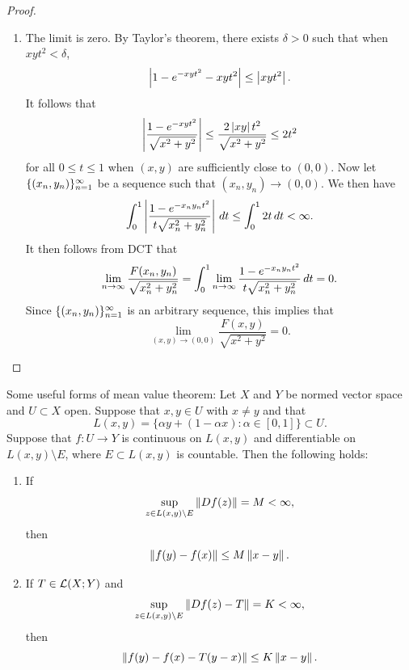 \documentclass[a4paper]{article}
\begin{document}
\begin{proof}
\begin{enumerate}
    \item The limit is zero. By Taylor's theorem, there exists $\delta >
          0$ such that when $x y t^2 < \delta$,
          \[
            \left\lvert 1 - e^{- x y t^2} - x y t^2\right\rvert \leq \left\lvert x y t^2\right\rvert.
          \]
          It follows that
          \[
            \left\lvert \frac{1 - e^{- x y t^2}}{\sqrt{x^2 + y^2}}\right\rvert
            \leq \frac{2 \left\lvert x y\right\rvert t^2}{\sqrt{x^2 + y^2}}
            \leq 2 t^2
          \]
          for all $0 \leq t \leq 1$ when $(x, y)$ are sufficiently close
          to $(0, 0)$. Now let $\{ (x_n, y_n) \}_{n=1}^\infty$ be a sequence such
          that $(x_n, y_n) \to (0, 0)$. We then have
          \[
            \int_0^1 \left\lvert \frac{1 - e^{- x_n y_n t^2}}{t \sqrt{x_n^2 + y_n^2}}\right\rvert \, d t
            \leq \int_0^1 2 t \, d t < \infty.
          \]
          It then follows from DCT that
          \[
            \lim_{n \to \infty} \frac{F(x_n, y_n)}{\sqrt{x_n^2 + y_n^2}}
            = \int_0^1 \lim_{n \to \infty} \frac{1 - e^{- x_n y_n t^2}}{t \sqrt{x_n^2 + y_n^2}} \, d t
            = 0.
          \]
          Since $\{ (x_n, y_n) \}_{n=1}^\infty$ is an arbitrary sequence, this
          implies that
          \[
            \lim_{(x, y) \to (0, 0)}  \frac{F(x, y)}{\sqrt{x^2 + y^2}} = 0.
          \]

  \end{enumerate}
\end{proof}

\begin{remark}

  Some useful forms of mean value theorem: Let $X$ and $Y$ be normed
  vector space and $U \subset X$ open. Suppose that $x, y \in U$ with $x
  \neq y$ and that
  \[
    L(x, y) = \{\alpha y + (1 - \alpha x) : \alpha \in [0, 1]\} \subset U.
  \]
  Suppose that $f : U \to Y$ is continuous on $L(x, y)$ and differentiable
  on $L(x, y) \setminus E$, where $E \subset L(x, y)$ is countable. Then
  the following holds:
  \begin{enumerate}
    \item If
          \[
            \sup_{z \in L(x, y) \setminus E} \left\lVert Df(z)\right\rVert = M < \infty,
          \]
          then
          \[
            \left\lVert f(y) - f(x)\right\rVert \leq M \left\lVert x - y\right\rVert.
          \]

    \item If $T \in \mathcal{L}(X; Y)$ and
          \[
            \sup_{z \in L(x, y) \setminus E} \left\lVert Df(z) - T\right\rVert = K < \infty,
          \]
          then
          \[
            \left\lVert f(y) - f(x) - T(y - x)\right\rVert \leq K \left\lVert x - y\right\rVert.
          \]
  \end{enumerate}
\end{remark}
\end{document}

